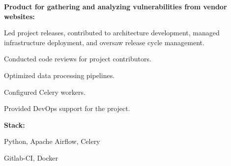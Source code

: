\documentclass[a4paper]{MagicalCV}
\begin{document}
\begin{minipage}[t]{0.64\textwidth}
\textbf{Product for gathering and analyzing vulnerabilities from vendor websites:}

\begin{tightemize}
  \item Led project releases, contributed to architecture development, managed infrastructure deployment, and oversaw release cycle management.
  \item Conducted code reviews for project contributors.
  \item Optimized data processing pipelines.
  \item Configured Celery workers.
  \item Provided DevOps support for the project.  
\end{tightemize}

\textbf{Stack:}
\begin{tightemize}
  \item Python, Apache Airflow, Celery
  \item Gitlab-CI, Docker
\end{tightemize}
\sectionsep

\end{minipage} 
\end{document}
